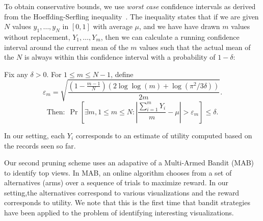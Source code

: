To obtain conservative bounds, we use {\it worst case} confidence intervals as derived from
the Hoeffding-Serfling inequality~\cite{serfling1974probability}.
The inequality states that if we are given $N$ values $y_1, \ldots, y_N$ in 
$[0, 1]$ with average $\mu$, and we have have drawn $m$ values without replacement, $Y_1, \ldots, Y_m$, 
then we can calculate a running confidence interval around the current mean 
of the $m$ values such that the actual mean of the $N$
is always within this confidence interval with a probability of $1 - \delta$:
\begin{theorem}
\label{thm:hs}

Fix any $\delta > 0$. For $1 \le m \le N-1$, define
{\small $$
\varepsilon_m = \sqrt{\frac{(1-\frac{m-1}N)(2\log \log (m) + \log(\pi^2/3\delta))}{2m}}.
$$
$$
\textrm{Then:} \ \   \Pr\left[ \exists m, 1 \le m \le N : 
  \left|\frac{\sum_{i=1}^m Y_i}{m} - \mu\right| > \varepsilon_m \right] 
\le \delta.
$$
}

\end{theorem}
In our setting, each $Y_i$ corresponds to an estimate of utility computed based on the
records seen so far. 


\label{sec:multi_armed_bandit}
Our second pruning scheme uses an adapative of a Multi-Armed Bandit (MAB)~\cite{bandits, AuerCF02, LaiR85} to identify top views.
In MAB, an online algorithm chooses from a set of alternatives (arms)
 over a sequence of trials to maximize reward.  In our setting,the  alternatives correspond to various visualizations and the reward corresponds
 to utility. 
We note that this is the first time that bandit strategies have been
applied to the problem of identifying interesting visualizations.

